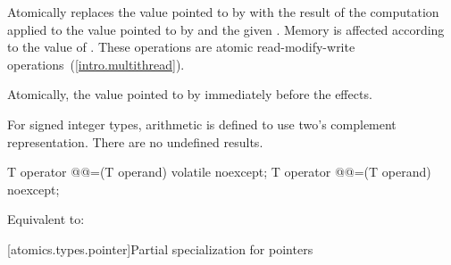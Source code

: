 \begin{itemdescr}
\pnum
\effects Atomically replaces the value pointed to by
 with the result of the computation applied to the
value pointed to by  and the given .
Memory is affected according to the value of .
These operations are atomic read-modify-write operations~(\ref{intro.multithread}).

\pnum
\returns Atomically, the value pointed to by  immediately before the effects.

\pnum
{}%
\remarks For signed integer types, arithmetic is defined to use two's complement representation.
There are no undefined results.
\end{itemdescr}

%
%
%
%
%
%
%
\begin{itemdecl}
T operator @@=(T operand) volatile noexcept;
T operator @@=(T operand) noexcept;
\end{itemdecl}

\begin{itemdescr}
\pnum
\effects Equivalent to: 
\end{itemdescr}

[atomics.types.pointer]{Partial specialization for pointers}
%

